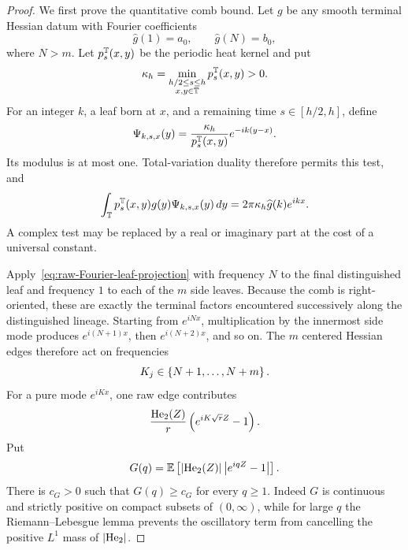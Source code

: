 \begin{proof}
We first prove the quantitative comb bound. Let $g$ be any smooth terminal Hessian datum with Fourier coefficients
\begin{equation*}
  \widehat g(1)=a_0,
  \qquad
  \widehat g(N)=b_0,
\end{equation*}
where $N>m$. Let $p_s^\mathbb T(x,y)$ be the periodic heat kernel and put
\begin{equation*}
  \kappa_h
  =
  \min_{\substack{h/2\leq s\leq h\\x,y\in\mathbb T}}
  p_s^\mathbb T(x,y)
  >0.
\end{equation*}
For an integer $k$, a leaf born at $x$, and a remaining time $s\in[h/2,h]$, define
\begin{equation*}
  \Psi_{k,s,x}(y)
  =
  \frac{\kappa_h}{p_s^\mathbb T(x,y)}
  e^{-ik(y-x)}.
\end{equation*}
Its modulus is at most one. Total-variation duality therefore permits this test, and
\begin{equation}
  \int_\mathbb T
  p_s^\mathbb T(x,y)g(y)\Psi_{k,s,x}(y)\,dy
  =
  2\pi\kappa_h\widehat g(k)e^{ikx}.
  \label{eq:raw-Fourier-leaf-projection}
\end{equation}
A complex test may be replaced by a real or imaginary part at the cost of a universal constant.

Apply~\eqref{eq:raw-Fourier-leaf-projection} with frequency $N$ to the final distinguished leaf and frequency $1$ to each of the $m$ side leaves. Because the comb is right-oriented, these are exactly the terminal factors encountered successively along the distinguished lineage. Starting from $e^{iNx}$, multiplication by the innermost side mode produces $e^{i(N+1)x}$, then $e^{i(N+2)x}$, and so on. The $m$ centered Hessian edges therefore act on frequencies
\begin{equation*}
  K_j\in\left\{N+1,\ldots,N+m\right\}.
\end{equation*}
For a pure mode $e^{iKx}$, one raw edge contributes
\begin{equation*}
  \frac{\operatorname{He}_2(Z)}r
  \left(e^{iK\sqrt rZ}-1\right).
\end{equation*}
Put
\begin{equation*}
  G(q)
  =
  \mathbb E\left[
    \left|\operatorname{He}_2(Z)\right|\left|e^{iqZ}-1\right|
  \right].
\end{equation*}
There is $c_G>0$ such that $G(q)\geq c_G$ for every $q\geq1$. Indeed $G$ is continuous and strictly positive on compact subsets of $(0,\infty)$, while for large $q$ the Riemann--Lebesgue lemma prevents the oscillatory term from cancelling the positive $L^1$ mass of $\left|\operatorname{He}_2\right|$.


\end{proof}
